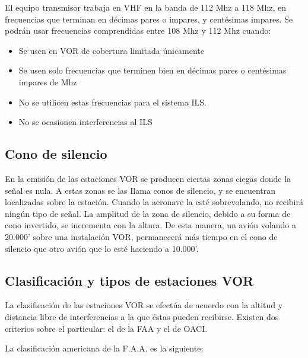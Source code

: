 El equipo transmisor trabaja en VHF en la banda de 112 Mhz a 118 Mhz, en frecuencias que terminan en décimas pares o impares, y centésimas impares. Se podrán usar frecuencias comprendidas entre 108 Mhz y 112 Mhz cuando:

\begin{itemize}
\item Se usen en VOR de cobertura limitada únicamente

\item Se usen solo frecuencias que terminen bien en décimas pares o centésimas impares de Mhz

\item No se utilicen estas frecuencias para el sistema ILS.

\item No se ocasionen interferencias al ILS
\end{itemize}


\subsection{Cono de silencio}

En la emisión de las estaciones VOR se producen ciertas zonas ciegas donde la señal es nula. A estas zonas se las Ilama conos de silencio, y se encuentran localizadas sobre la estación. Cuando la aeronave la esté sobrevolando, no recibirá ningún tipo de señal. La amplitud de la zona de silencio, debido a su forma de cono invertido, se incrementa con la altura. De esta manera, un avión volando a 20.000' sobre una instalación VOR, permanecerá más tiempo en el cono de silencio que otro avión que lo esté haciendo a 10.000'.

\subsection{Clasificación y tipos de estaciones VOR}
\label{sec:clasificacion.y.tipo.estaciones.vor}

La clasificación de las estaciones VOR se efectúa de acuerdo con la altitud y distancia libre de interferencias a la que éstas pueden recibirse. Existen dos criterios sobre el particular: el de la FAA y el de OACI.

La clasificación americana de la F.A.A. es la siguiente:

